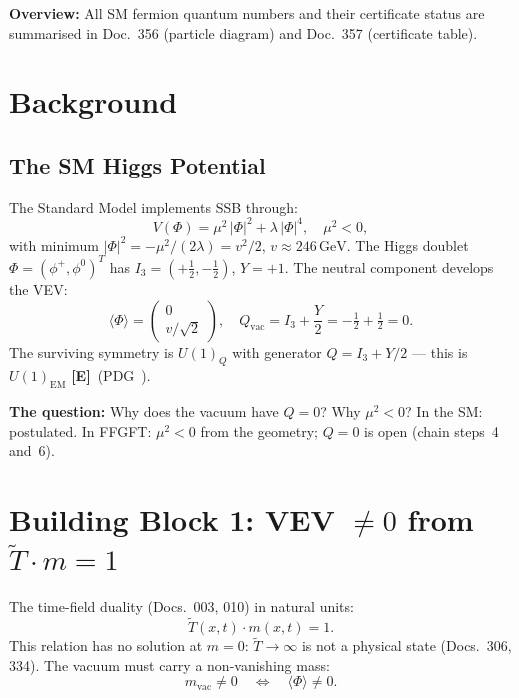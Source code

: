 \textbf{Overview:} All SM fermion quantum numbers and their certificate
status are summarised in Doc.~356 (particle diagram) and Doc.~357
(certificate table).

\section{Background}

\subsection*{The SM Higgs Potential}

The Standard Model implements SSB through:
\begin{equation}
  V(\Phi) = \mu^2\,|\Phi|^2 + \lambda\,|\Phi|^4,
  \quad \mu^2 < 0,
  \label{eq:higgs_pot}
\end{equation}
with minimum $|\Phi|^2 = -\mu^2/(2\lambda) = v^2/2$, $v\approx246\,\text{GeV}$.
The Higgs doublet $\Phi = (\phi^+,\phi^0)^T$ has $I_3 = (+\tfrac{1}{2},-\tfrac{1}{2})$,
$Y = +1$. The
neutral component develops the VEV:
\begin{equation}
  \langle\Phi\rangle = \begin{pmatrix}0\\v/\sqrt{2}\end{pmatrix},
  \quad Q_\text{vac} = I_3 + \frac{Y}{2} = -\tfrac{1}{2}+\tfrac{1}{2} = 0.
  \label{eq:sm_vev}
\end{equation}
The surviving symmetry is $U(1)_Q$ with generator $Q=I_3+Y/2$ ---
this is $U(1)_\text{EM}$ \textbf{[E]}\ (PDG~\QM).

\textbf{The question:} Why does the vacuum have $Q=0$? Why $\mu^2<0$?
In the SM: postulated. In FFGFT: $\mu^2<0$ from the geometry; $Q=0$ is open
(chain steps~4 and~6).

\section{Building Block 1: VEV $\neq 0$ from $\tilde{T}\cdot m = 1$}

The time-field duality (Docs.~003, 010) in natural units:
\begin{equation}
  \tilde{T}(x,t)\cdot m(x,t) = 1.
  \label{eq:tm1}
\end{equation}
This relation has no solution at $m=0$: $\tilde{T}\to\infty$ is not a
physical state (Docs.~306, 334). The vacuum must carry a non-vanishing mass:
\begin{equation}
  m_\text{vac} \neq 0 \quad\Longleftrightarrow\quad \langle\Phi\rangle \neq 0.
  \label{eq:vev_nonzero}
\end{equation}

